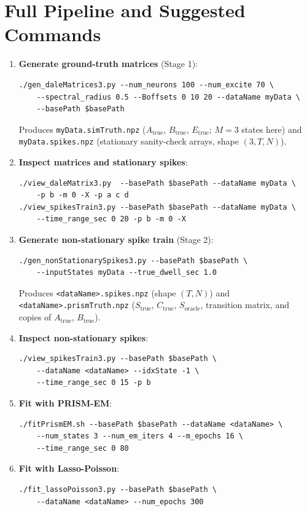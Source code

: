 \documentclass[11pt]{article}
\begin{document}
\section{Full Pipeline and Suggested Commands}
\label{sec:pipeline}

\begin{enumerate}

\item \textbf{Generate ground-truth matrices} (Stage 1):
\begin{verbatim}
./gen_daleMatrices3.py --num_neurons 100 --num_excite 70 \
    --spectral_radius 0.5 --Boffsets 0 10 20 --dataName myData \
    --basePath $basePath
\end{verbatim}
Produces \texttt{myData.simTruth.npz} ($A_{\text{true}}$,
$B_{\text{true}}$, $E_{\text{true}}$; $M=3$ states here) and
\texttt{myData.spikes.npz} (stationary sanity-check arrays,
shape $(3, T, N)$).

\item \textbf{Inspect matrices and stationary spikes}:
\begin{verbatim}
./view_daleMatrix3.py  --basePath $basePath --dataName myData \
    -p b -m 0 -X -p a c d
./view_spikesTrain3.py --basePath $basePath --dataName myData \
    --time_range_sec 0 20 -p b -m 0 -X
\end{verbatim}

\item \textbf{Generate non-stationary spike train} (Stage 2):
\begin{verbatim}
./gen_nonStationarySpikes3.py --basePath $basePath \
    --inputStates myData --true_dwell_sec 1.0
\end{verbatim}
Produces \texttt{<dataName>.spikes.npz} (shape $(T, N)$) and
\texttt{<dataName>.prismTruth.npz} ($S_{\text{true}}$,
$C_{\text{true}}$, $S_{\text{oracle}}$, transition matrix, and
copies of $A_{\text{true}}$, $B_{\text{true}}$).

\item \textbf{Inspect non-stationary spikes}:
\begin{verbatim}
./view_spikesTrain3.py --basePath $basePath \
    --dataName <dataName> --idxState -1 \
    --time_range_sec 0 15 -p b
\end{verbatim}

\item \textbf{Fit with PRISM-EM}:
\begin{verbatim}
./fitPrismEM.sh --basePath $basePath --dataName <dataName> \
    --num_states 3 --num_em_iters 4 --m_epochs 16 \
    --time_range_sec 0 80
\end{verbatim}

\item \textbf{Fit with Lasso-Poisson}:
\begin{verbatim}
./fit_lassoPoisson3.py --basePath $basePath \
    --dataName <dataName> --num_epochs 300
\end{verbatim}

\end{enumerate}
\end{document}
